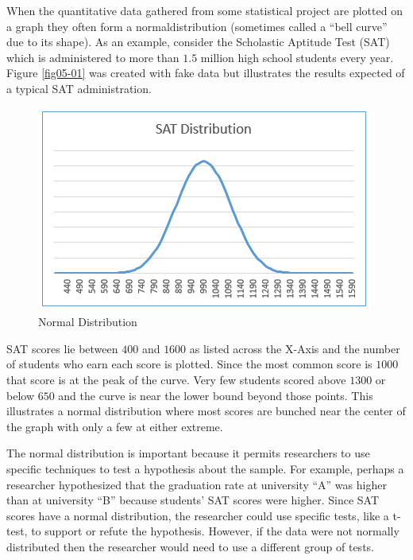 When the quantitative data gathered from some statistical project are plotted on a graph they often form a \gls{normaldistribution} (sometimes called a ``bell curve'' due to its shape). As an example, consider the Scholastic Aptitude Test (SAT) which is administered to more than $ 1.5 $ million high school students every year. Figure \ref{fig05-01} was created with fake data but illustrates the results expected of a typical SAT administration.

\begin{figure}[H]
	\centering
	\includegraphics[width=\maxwidth{.95\linewidth}]{gfx/06-SATDistro}
	\caption{Normal Distribution}
	\label{fig06-01}
\end{figure}

SAT scores lie between $ 400 $ and $ 1600 $ as listed across the X-Axis and the number of students who earn each score is plotted. Since the most common score is $ 1000 $ that score is at the peak of the curve. Very few students scored above $ 1300 $ or below $ 650 $ and the curve is near the lower bound beyond those points. This illustrates a normal distribution where most scores are bunched near the center of the graph with only a few at either extreme.

The normal distribution is important because it permits researchers to use specific techniques to test a hypothesis about the sample. For example, perhaps a researcher hypothesized that the graduation rate at university ``A'' was higher than at university ``B'' because students' SAT scores were higher. Since SAT scores have a normal distribution, the researcher could use specific tests, like a t-test, to support or refute the hypothesis. However, if the data were not normally distributed then the researcher would need to use a different group of tests.

